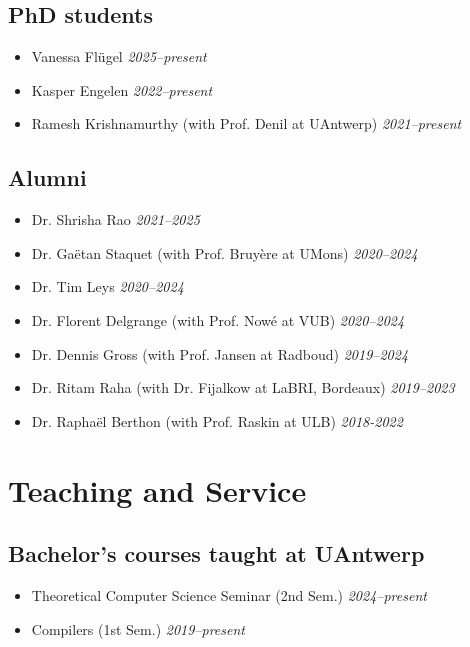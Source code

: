 \documentclass[10pt,a4paper]{moderncv}
\begin{document}
\subsection{PhD students}
\begin{itemize}
  \item Vanessa Fl\"ugel \hfill \textit{2025--present}
  \item Kasper Engelen \hfill \textit{2022--present}
  \item Ramesh Krishnamurthy (with Prof. Denil at UAntwerp) \hfill \textit{2021--present}
\end{itemize}

\subsection{Alumni}
\begin{itemize}
  \item Dr. Shrisha Rao \hfill \textit{2021--2025}
  \item Dr. Ga\"etan Staquet (with Prof. Bruy\`ere at UMons) \hfill
    \textit{2020--2024}
  \item Dr. Tim Leys \hfill \textit{2020--2024}
  \item Dr. Florent Delgrange (with Prof. Now\'e at VUB) \hfill
    \textit{2020--2024}
  \item Dr. Dennis Gross (with Prof. Jansen at Radboud) \hfill
    \textit{2019--2024} 
  \item Dr. Ritam Raha (with Dr. Fijalkow at LaBRI, Bordeaux) \hfill
    \textit{2019--2023}
  \item Dr. Rapha\"el Berthon (with Prof. Raskin at ULB) \hfill
    \textit{2018-2022}
\end{itemize}

\section{Teaching and Service}
\subsection{Bachelor's courses taught at UAntwerp}
\begin{itemize}
  \item Theoretical Computer Science Seminar (2nd Sem.) \hfill
    \textit{2024--present}
  \item Compilers (1st Sem.) \hfill \textit{2019--present}
\end{itemize}
\end{document}
